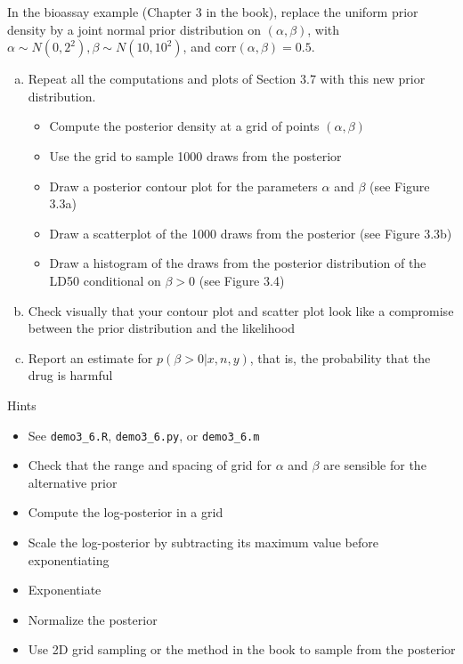 \documentclass[a4paper,11pt]{article}
\begin{document}
In the bioassay example (Chapter 3 in the book), replace the uniform prior density by a joint normal prior distribution on $(\alpha, \beta)$, with $\alpha \sim N(0,2^2), \beta \sim N(10,10^2)$, and $\mathrm{corr}(\alpha, \beta)=0.5$.
\begin{enumerate}[a)]
\item Repeat all the computations and plots of Section 3.7 with this
  new prior distribution.
  \begin{itemize}
  	\item Compute the posterior density at a grid of points $(\alpha,\beta)$
  	\item Use the grid to sample 1000 draws from the posterior
  	\item Draw a posterior contour plot for the parameters $\alpha$ and $\beta$ (see Figure 3.3a)
  	\item Draw a scatterplot of the 1000 draws from the posterior (see Figure 3.3b)
  	\item Draw a histogram of the draws from the posterior distribution of the LD50 conditional on $\beta > 0$ (see Figure 3.4)
  \end{itemize}
\item Check visually that your contour plot and scatter plot look like a
  compromise between the prior distribution and the likelihood
\item Report an estimate for $p(\beta>0|x, n, y)$, that is, the probability that the drug is harmful
\end{enumerate}
Hints
\begin{itemize}
\item See {\tt demo3\_6.R}, {\tt demo3\_6.py}, or {\tt demo3\_6.m}
\item Check that the range and spacing of grid for $\alpha$ and
  $\beta$ are sensible for the alternative prior
\item Compute the log-posterior in a grid
\item Scale the log-posterior by subtracting its maximum value before
  exponentiating
\item Exponentiate
\item Normalize the posterior
\item Use 2D grid sampling or the method in the book to sample from the posterior
\end{itemize}
\end{document}
